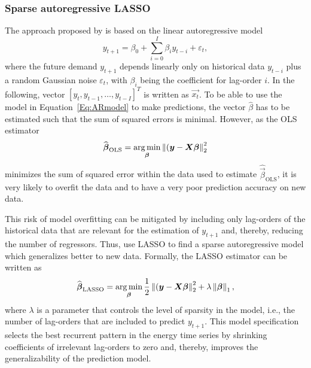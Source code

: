 \subsubsection{Sparse autoregressive LASSO}

The approach proposed by \citet{Li:2017} is based on the linear autoregressive model
%
\begin{equation} \label{Eq:ARmodel}
    y_{t+1}=\beta_0+\sum_{i=0}^I\beta_iy_{t-i}+\varepsilon_t,
\end{equation}
%
where the future demand $y_{t+1}$ depends linearly only on historical data $y_{t-i}$ plus a random Gaussian noise $\varepsilon_t$, with $\beta_i$ being the coefficient for lag-order $i$. In the following, vector $\left[y_t, y_{t-1}, \dots, y_{t-I}\right]^T$ is written as $\vec{x_t}$. To be able to use the model in Equation~\ref{Eq:ARmodel} to make predictions, the vector $\widehat{\beta}$ has to be estimated such that the sum of squared errors is minimal. However, as the OLS estimator
%
\begin{equation} \label{Eq:betaOLS}
    \widehat{\boldsymbol{\beta}}_{\text{OLS}}=\operatorname*{\arg\min}_{\boldsymbol{\beta}}\left\lVert(\boldsymbol{y}-\boldsymbol{X}\boldsymbol{\beta}\right\rVert^2_2
\end{equation}
%
minimizes the sum of squared error within the data used to estimate $\widehat{\vec{\beta}}_{\text{OLS}}$, it is very likely to overfit the data and to have a very poor prediction accuracy on new data.

This risk of model overfitting can be mitigated by including only lag-orders of the historical data that are relevant for the estimation of $y_{t+1}$ and, thereby, reducing the number of regressors. Thus, \citet{Li:2017} use LASSO \citetext{least absolute shrinkage and selection operator, see \citet{Tibshirani:1996}} to find a sparse autoregressive model which generalizes better to new data. Formally, the LASSO estimator can be written as
%
\begin{equation} \label{Eq:betaLASSO}
    \widehat{\boldsymbol{\beta}}_{\text{LASSO}}=\operatorname*{\arg\min}_{\boldsymbol{\beta}}\frac{1}{2}\left\lVert(\boldsymbol{y}-\boldsymbol{X}\boldsymbol{\beta}\right\rVert^2_2+\lambda\left\lVert\boldsymbol{\beta}\right\rVert_1,
\end{equation}
%
where $\lambda$ is a parameter that controls the level of sparsity in the model, i.e., the number of lag-orders that are included to predict $y_{t+1}$. This model specification selects the best recurrent pattern in the energy time series by shrinking coefficients of irrelevant lag-orders to zero and, thereby, improves the generalizability of the prediction model.



